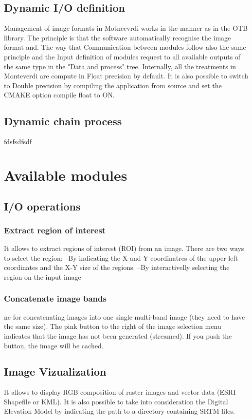 \documentclass{InsightSoftwareGuide}
\begin{document}
\section{Dynamic I/O definition}
Management of image formats in Motneevrdi works in the manner as in the OTB library.
The principle is that the software automatically recognise the image format and.
The way that
Communication between modules follow also the same principle and the Input definition of modules request to all available
outputs of the same type in the "Data and process" tree.
Internally, all the treatments in Monteverdi are compute in Float precision by default. It is also possible to switch to Double 
precision by compiling the application from source and set the CMAKE option compile float to ON.
 

\section{Dynamic chain process}
fdsfsdfsdf

\chapter{Available modules}
\section{I/O operations}
\subsection{Extract region of interest}
It allows to extract regions of interest (ROI) from an image. There are two ways to select the region:
--By indicating the X and Y coordinatres of the upper-left coordinates and the X-Y size of the regions.
--By interactivelly selecting the region on the input image
\subsection{Concatenate image bands}
ne for concatenating images into one single multi-band image (they need to have the same size).
The pink button to the right of the image selection menu indicates that the image has not been generated (streamed). 
If you push the button, the image will be cached. 
\section{Image Vizualization}
It allows to display RGB composition of raster images and vector data (ESRI Shapefile or KML). It is also possible to take 
into consideration the Digital Elevation Model by indicating the path to a directory containing SRTM files. 
\end{document}
